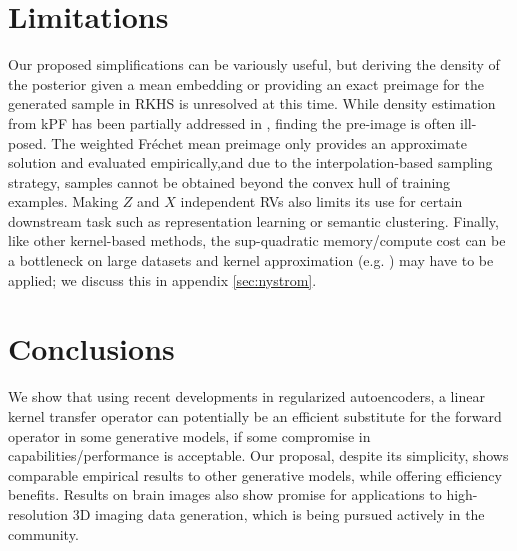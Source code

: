 \section{Limitations}
\label{sec:limitations}
Our proposed simplifications can be variously
useful, but deriving the density of the posterior given a mean embedding or providing an exact preimage for the generated sample in RKHS is unresolved at this time. 
While density estimation from kPF has been partially addressed in \citet{schuster2020kernelconditional}, finding the pre-image is often ill-posed. The weighted Fr\'{e}chet mean preimage only provides an approximate solution and evaluated empirically,and due to the interpolation-based sampling strategy, samples cannot be obtained beyond the convex hull of training examples. Making $Z$ and $X$ independent RVs also limits its use for certain downstream task such as representation learning or semantic clustering. Finally, like other kernel-based methods, the sup-quadratic memory/compute cost can be a bottleneck on large datasets and kernel approximation (e.g. \citep{rahimi2008random}) may have to be applied; we discuss this in appendix \ref{sec:nystrom}.


\section{Conclusions}
We show that using recent developments in regularized autoencoders, a linear kernel transfer operator can potentially be an efficient substitute for the forward operator in some generative models, if 
some compromise in capabilities/performance is acceptable. Our proposal, despite its simplicity, shows comparable empirical results to other generative models, while offering efficiency benefits. Results on brain images also show promise for applications to high-resolution 3D imaging data generation, which is being pursued actively in the community.

